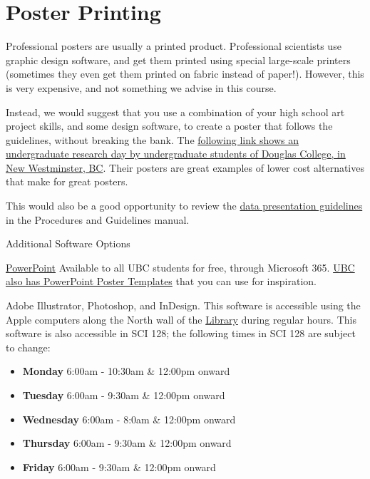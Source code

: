 \documentclass[
]{book}
\providecommand{\tightlist}{%
  \setlength{\itemsep}{0pt}\setlength{\parskip}{0pt}}
\begin{document}
\hypertarget{poster-printing}{%
\chapter*{Poster Printing}\label{poster-printing}}

Professional posters are usually a printed product. Professional scientists use graphic design software, and get them printed using special large-scale printers (sometimes they even get them printed on fabric instead of paper!). However, this is very expensive, and not something we advise in this course.

Instead, we would suggest that you use a combination of your high school art project skills, and some design software, to create a poster that follows the guidelines, without breaking the bank. The \href{https://www.flickr.com/photos/48875799@N03/sets/72157623621098575/show/}{following link shows an undergraduate research day by undergraduate students of Douglas College, in New Westminster, BC}. Their posters are great examples of lower cost alternatives that make for great posters.

This would also be a good opportunity to review the \href{https://ubco-biology.github.io/Procedures-and-Guidelines/figures-tables.html}{data presentation guidelines} in the Procedures and Guidelines manual.

Additional Software Options

\href{https://it.ubc.ca/services/desktop-print-services/software-licensing/microsoft-365-office-students}{PowerPoint} Available to all UBC students for free, through Microsoft 365. \href{https://brand.ubc.ca/guidelines/downloads/print-and-presentation-templates/}{UBC also has PowerPoint Poster Templates} that you can use for inspiration.

Adobe Illustrator, Photoshop, and InDesign. This software is accessible using the Apple computers along the North wall of the \href{https://library.ok.ubc.ca/}{Library} during regular hours. This software is also accessible in SCI 128; the following times in SCI 128 are subject to change:

\begin{itemize}
\tightlist
\item
  \textbf{Monday} 6:00am - 10:30am \& 12:00pm onward
\item
  \textbf{Tuesday} 6:00am - 9:30am \& 12:00pm onward
\item
  \textbf{Wednesday} 6:00am - 8:0am \& 12:00pm onward
\item
  \textbf{Thursday} 6:00am - 9:30am \& 12:00pm onward
\item
  \textbf{Friday} 6:00am - 9:30am \& 12:00pm onward
\end{itemize}
\end{document}
